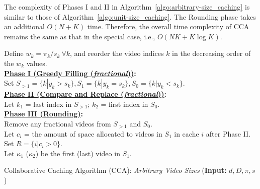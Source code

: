 \documentclass[conference]{IEEEtran}
\begin{document}
The complexity of Phases I and II in Algorithm~\ref{algo:arbitrary-size_caching} is similar to those of Algorithm~\ref{algo:unit-size_caching}. The Rounding phase takes an additional $O(N+K)$ time. Therefore, the overall time complexity of CCA remains the same as that in the special case, i.e., $O(NK + K \log K)$.

\begin{algorithm}
Define $w_k = \pi_k/s_k \ \forall k$, and reorder the video indices $k$ in the decreasing order of the $w_k$ values.\\
 \textbf{\underline{Phase I (Greedy Filling (\textit{fractional}))}:}\\
 Set $S_{>1} = \{k | y_k>s_k\}, S_{1} = \{k | y_k=s_k\}, S_{0} = \{k | y_k<s_k\}$.\\
 \textbf{\underline{Phase II (Compare and Replace (\textit{fractional}))}:}\\
 Let $k_1$ = last index in $S_{>1}$; $k_2$ = first index in $S_{0}$. \\
 \textbf{\underline{Phase III (Rounding)}:}\\
 Remove any fractional videos from $S_{>1}$ and $S_0$. \\
Let $c_i$ = the amount of space allocated to videos in $S_1$ in cache $i$ after Phase II. Set $R = \{i | c_i > 0\}$.\\
Let $\kappa_1$ ($\kappa_2$) be the first (last) video in $S_1$.\\
\caption{Collaborative Caching Algorithm (CCA): \textit{Arbitrary Video Sizes} (\textbf{Input:} $d,D,\pi, s$)}
\label{algo:arbitrary-size_caching}
\end{algorithm}
\vspace{3mm}
\end{document}
